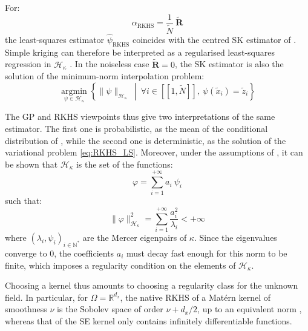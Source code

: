 \begin{remark}
	For:
	\begin{equation}
		\alpha_{\mathrm{RKHS}}=\frac{1}{\tilde{N}}\:\tilde{\mathbf{R}}
	\end{equation}
	the least-squares estimator $\hat{\psi}_{\mathrm{RKHS}}$ coincides with the centred SK estimator of . Simple kriging can therefore be interpreted as a regularised least-squares regression in $\mathcal{H}_\kappa$ \cite{bib:GP-kernel-methods}. In the noiseless case $\tilde{\mathbf{R}}=0$, the SK estimator is also the solution of the minimum-norm interpolation problem:
	\begin{equation}
		\underset{\psi\in\mathcal{H}_\kappa}{\operatorname{argmin}}\left\{\|\psi\|_{\mathcal{H}_\kappa}\:\middle|\:\forall i\in[\![1,\tilde{N}]\!],\:\psi(\tilde{x}_i)=\tilde{z}_i\right\}
	\end{equation}
\end{remark}

\begin{remark}
	The GP and RKHS viewpoints thus give two interpretations of the same estimator. The first one is probabilistic, as the mean of the conditional distribution of , while the second one is deterministic, as the solution of the variational problem \eqref{eq:RKHS_LS}. Moreover, under the assumptions of , it can be shown \cite{bib:Rasmussen-relationships} that $\mathcal{H}_\kappa$ is the set of the functions:
	\begin{equation}
		\varphi=\sum_{i=1}^{+\infty}a_i\:\psi_i
	\end{equation}
	such that:
	\begin{equation}
		\|\varphi\|_{\mathcal{H}_\kappa}^2=\sum_{i=1}^{+\infty}\frac{a_i^2}{\lambda_i}<+\infty
	\end{equation}
	where $(\lambda_i,\psi_i)_{i\in\mathbb{N}^*}$ are the Mercer eigenpairs of $\kappa$. Since the eigenvalues converge to $0$, the coefficients $a_i$ must decay fast enough for this norm to be finite, which imposes a regularity condition on the elements of $\mathcal{H}_\kappa$.

	Choosing a kernel thus amounts to choosing a regularity class for the unknown field. In particular, for $\Omega=\mathbb{R}^{d_x}$, the native RKHS of a Matérn kernel of smoothness $\nu$ is the Sobolev space of order $\nu+d_x/2$, up to an equivalent norm \cite{bib:Wendland}, whereas that of the SE kernel only contains infinitely differentiable functions.
\end{remark}


